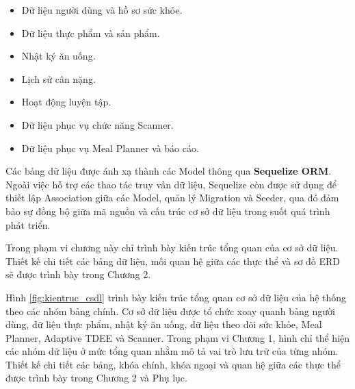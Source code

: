 \documentclass[12pt, a4paper]{report}
\begin{document}
\begin{itemize}
\item Dữ liệu người dùng và hồ sơ sức khỏe.
\item Dữ liệu thực phẩm và sản phẩm.
\item Nhật ký ăn uống.
\item Lịch sử cân nặng.
\item Hoạt động luyện tập.
\item Dữ liệu phục vụ chức năng Scanner.
\item Dữ liệu phục vụ Meal Planner và báo cáo.
\end{itemize}
Các bảng dữ liệu được ánh xạ thành các Model thông qua \textbf{Sequelize ORM}. Ngoài việc hỗ trợ các thao tác truy vấn dữ liệu, Sequelize còn được sử dụng để thiết lập Association giữa các Model, quản lý Migration và Seeder, qua đó đảm bảo sự đồng bộ giữa mã nguồn và cấu trúc cơ sở dữ liệu trong suốt quá trình phát triển.

Trong phạm vi chương này chỉ trình bày kiến trúc tổng quan của cơ sở dữ liệu. Thiết kế chi tiết các bảng dữ liệu, mối quan hệ giữa các thực thể và sơ đồ ERD sẽ được trình bày trong Chương 2.

Hình \ref{fig:kientruc_csdl} trình bày kiến trúc tổng quan cơ sở dữ liệu của hệ thống theo các nhóm bảng chính. Cơ sở dữ liệu được tổ chức xoay quanh bảng người dùng, dữ liệu thực phẩm, nhật ký ăn uống, dữ liệu theo dõi sức khỏe, Meal Planner, Adaptive TDEE và Scanner. Trong phạm vi Chương 1, hình chỉ thể hiện các nhóm dữ liệu ở mức tổng quan nhằm mô tả vai trò lưu trữ của từng nhóm. Thiết kế chi tiết các bảng, khóa chính, khóa ngoại và quan hệ giữa các thực thể được trình bày trong Chương 2 và Phụ lục.
\end{document}
